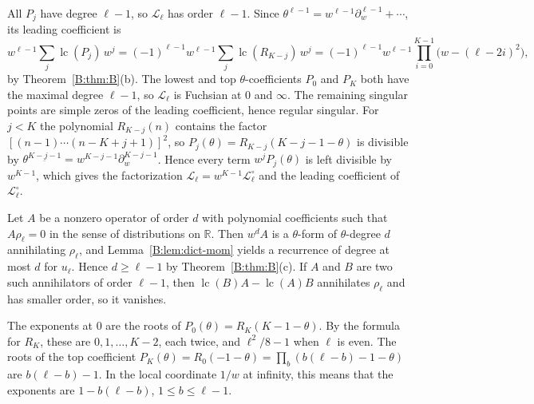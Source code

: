 \documentclass[11pt,a4paper]{article}
\theoremstyle{definition}
\theoremstyle{remark}
\newcommand{\R}{\mathbb R}
\newcommand{\ff}[2]{#1^{\underline{#2}}}
\DeclareMathOperator{\lc}{lc}
\numberwithin{equation}{section}
\begin{document}
All $P_j$ have degree $\ell-1$, so $\mathcal L_\ell$ has order $\ell-1$. Since $\theta^{\ell-1}=w^{\ell-1}\partial_w^{\ell-1}+\cdots$, its leading coefficient is
\[
w^{\ell-1}\sum_j\lc(P_j)\,w^j=(-1)^{\ell-1}w^{\ell-1}\sum_j\lc(R_{K-j})\,w^j=(-1)^{\ell-1}w^{\ell-1}\prod_{i=0}^{K-1}\bigl(w-(\ell-2i)^2\bigr),
\]
by Theorem~\ref{B:thm:B}(b). The lowest and top $\theta$-coefficients $P_0$ and $P_K$ both have the maximal degree $\ell-1$, so $\mathcal L_\ell$ is Fuchsian at $0$ and $\infty$. The remaining singular points are simple zeros of the leading coefficient, hence regular singular. For $j<K$ the polynomial $R_{K-j}(n)$ contains the factor $[(n-1)\cdots(n-K+j+1)]^2$, so $P_j(\theta)=R_{K-j}(K-j-1-\theta)$ is divisible by $\ff{\theta}{K-j-1}=w^{K-j-1}\partial_w^{K-j-1}$. Hence every term $w^jP_j(\theta)$ is left divisible by $w^{K-1}$, which gives the factorization $\mathcal L_\ell=w^{K-1}\mathcal L^\circ_\ell$ and the leading coefficient of $\mathcal L^\circ_\ell$.

Let $A$ be a nonzero operator of order $d$ with polynomial coefficients such that $A\rho_\ell=0$ in the sense of distributions on $\R$. Then $w^dA$ is a $\theta$-form of $\theta$-degree $d$ annihilating $\rho_\ell$, and Lemma~\ref{B:lem:dict-mom} yields a recurrence of degree at most $d$ for $u_\ell$. Hence $d\ge\ell-1$ by Theorem~\ref{B:thm:B}(c). If $A$ and $B$ are two such annihilators of order $\ell-1$, then $\lc(B)A-\lc(A)B$ annihilates $\rho_\ell$ and has smaller order, so it vanishes.

The exponents at $0$ are the roots of $P_0(\theta)=R_K(K-1-\theta)$. By the formula for $R_K$, these are $0,1,\dots,K-2$, each twice, and $\ell^2/8-1$ when $\ell$ is even. The roots of the top coefficient $P_K(\theta)=R_0(-1-\theta)=\prod_b(b(\ell-b)-1-\theta)$ are $b(\ell-b)-1$. In the local coordinate $1/w$ at infinity, this means that the exponents are $1-b(\ell-b)$, $1\le b\le\ell-1$.
\end{document}
